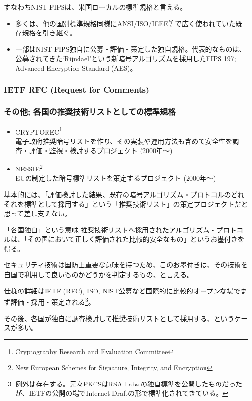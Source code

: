 \documentclass[12pt,dvipdfmx]{beamer}
\begin{document}
\begin{frame}
すなわちNIST FIPSは、米国ローカルの標準規格と言える。

\begin{itemize}
\item 多くは、他の国別標準規格同様にANSI/ISO/IEEE等で広く使われていた既存規格を引き継ぐ。
\item 一部はNIST FIPS独自に公募・評価・策定した独自規格。代表的なものは、公募されてきた`Rijndael'という新暗号アルゴリズムを採用したFIPS 197; Advanced Encryption Standard (AES)。
\end{itemize}
\end{frame}

\begin{frame}
\frametitle{IETF RFC (Request for Comments)}
\end{frame}

\begin{frame}
\frametitle{その他; 各国の推奨技術リストとしての標準規格}
\small
\begin{itemize}
 \item CRYPTOREC\footnote[frame]{\scriptsize Cryptography Research and Evaluation Committee} \\
電子政府推奨暗号リストを作り、その実装や運用方法も含めて安全性を調査・評価・監視・検討するプロジェクト (2000年〜)
 \item NESSIE\footnote[frame]{\scriptsize New European Schemes for Signature, Integrity, and Encryption}\\
EUの制定した暗号標準リストを策定するプロジェクト (2000年〜)
\end{itemize}
基本的には、「評価検討した結果、\underline{既存}の暗号アルゴリズム・プロトコルのどれそれを標準として採用する」という\alert{「推奨技術リスト」の策定プロジェクト}だと思って差し支えない。
\end{frame}

\begin{frame}
\small
 
\begin{block}{\small 「各国独自」という意味}
推奨技術リストへ採用されたアルゴリズム・プロトコルは、「その国において正しく評価された比較的安全なもの」というお墨付きを得る。


\underline{セキュリティ技術は国防上重要な意味を持つ}ため、このお墨付きは、その技術を自国で利用して良いものかどうかを判定するもの、と言える。
\end{block}

仕様の詳細はIETF (RFC), ISO, NIST公募など国際的に比較的オープンな場でまず評価・採用・策定される\footnote[frame]{\scriptsize 例外は存在する。元々PKCSはRSA Labs.の独自標準を公開したものだったが、IETFの公開の場でInternet Draftの形で標準化されてきている。}。

\vspace{1ex}

その後、各国が独自に調査検討して推奨技術リストとして採用する、というケースが多い。

\end{frame}
\end{document}
